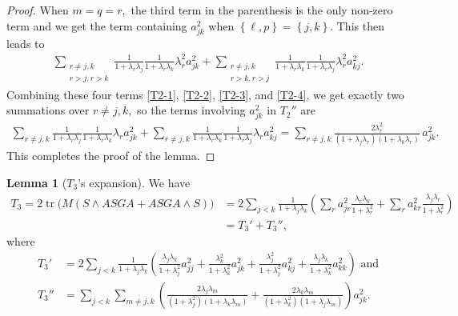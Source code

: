 \documentclass[11pt]{amsart}
\numberwithin{equation}{section}
\theoremstyle{definition}
\theoremstyle{definition}
\newtheorem{lemma}[equation]{Lemma}
\newcommand{\set}[1]{\left\{#1\right\}}
\newcommand{\pr}[1]{\left(#1\right)}
\begin{document}
\begin{proof}
	When $m=q=r,$ the third term in the parenthesis is the only non-zero term and we get the term containing $a_{jk}^2$ when $\set{\ell,p}=\set{j,k}.$
	This then leads to
	\begin{align}\label{T2-4}
	\sum_{\substack{r\neq j,k\\r>j,r>k}}
	\frac 1{1+\lambda_r\lambda_j}
	\frac 1{1+\lambda_r\lambda_k}
	\lambda_r^2 a_{jk}^2
	+ \sum_{\substack{r\neq j,k\\r>k,r>j}}
	\frac 1{1+\lambda_r\lambda_k}
	\frac 1{1+\lambda_r\lambda_j}
	\lambda_r^2 a_{kj}^2.
	\end{align}
	Combining these four terms \eqref{T2-1}, \eqref{T2-2}, \eqref{T2-3}, and \eqref{T2-4}, we get exactly two summations over $r\neq j,k,$ so the terms involving $a_{jk}^2$ in $T_2''$ are 
	\begin{align*}
	\sum_{r\neq j,k}
	\frac 1{1+\lambda_r\lambda_j}
	\frac 1{1+\lambda_r\lambda_k}
	\lambda_r a_{jk}^2
	+ \sum_{r\neq j,k}
	\frac 1{1+\lambda_r\lambda_k}
	\frac 1{1+\lambda_r\lambda_j}
	\lambda_r a_{kj}^2
	= \sum_{r\neq j,k}
	\frac{2\lambda_r^2}
	{(1+\lambda_j\lambda_r)(1+\lambda_k\lambda_r)}
	\, a_{jk}^2.
	\end{align*}
	This completes the proof of the lemma.
\end{proof}




\begin{lemma}[$T_3$'s expansion]
	\label{lem:T3}
	We have
	\begin{align*}
	T_3
	=2 \operatorname{tr}\big(M (S \wedge A S G A + A S G A \wedge S)\big)
    &=2 \sum_{j<k}
	\frac 1{1+\lambda_j\lambda_k}
	\pr{\sum_r a_{jr}^2
		\frac{\lambda_r \lambda_k} {1+\lambda_r^2} 
		+ \sum_r  a_{kr}^2
		\frac{\lambda_j\lambda_r}
		{1+\lambda_r^2}
	}\\
	&=T_3'+T_3'',
	\end{align*}
	where 
	\begin{align*} 
	T_3'&=  2 
	\sum_{j<k}\frac 1{1+\lambda_j\lambda_k}
	\pr{
		\frac{\lambda_j\lambda_k}{1+\lambda_j^2} a_{jj}^2
		+ \frac{\lambda_k^2}{1+\lambda_k^2} a_{jk}^2
		+ \frac{\lambda_j^2}{1+\lambda_j^2} a_{kj}^2
		+ \frac{\lambda_j\lambda_k}{1+\lambda_k^2} a_{kk}^2
	}\text{ and}\\
	T_3''&= \sum_{j<k}
	\sum_{m\neq j,k}
	\pr{
		\frac{2\lambda_j\lambda_m}{(1+\lambda_j^2)(1+\lambda_k\lambda_m)}
		+ \frac{2\lambda_k\lambda_m}{(1+\lambda_k^2)(1+\lambda_j\lambda_m)}
	}a_{jk}^2.
	\end{align*}
\end{lemma}
\end{document}
